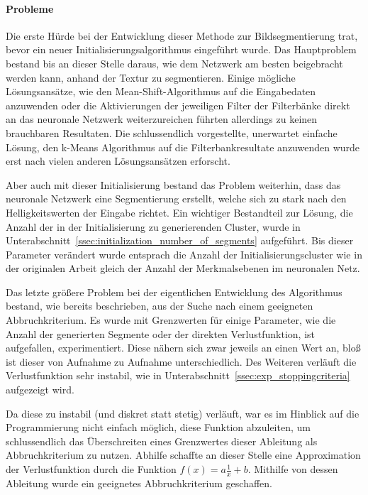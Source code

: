 \paragraph{Probleme} Die erste Hürde bei der Entwicklung dieser Methode zur Bildsegmentierung trat, bevor ein neuer Initialisierungsalgorithmus eingeführt wurde. Das Hauptproblem bestand bis an dieser Stelle daraus, wie dem Netzwerk am besten beigebracht werden kann, anhand der Textur zu segmentieren. Einige mögliche Lösungsansätze, wie den Mean-Shift-Algorithmus auf die Eingabedaten anzuwenden oder die Aktivierungen der jeweiligen Filter der Filterbänke direkt an das neuronale Netzwerk weiterzureichen führten allerdings zu keinen brauchbaren Resultaten. Die schlussendlich vorgestellte, unerwartet einfache Lösung, den k-Means Algorithmus auf die Filterbankresultate anzuwenden wurde erst nach vielen anderen Lösungsansätzen erforscht.

Aber auch mit dieser Initialisierung bestand das Problem weiterhin, dass das neuronale Netzwerk eine Segmentierung erstellt, welche sich zu stark nach den Helligkeitswerten der Eingabe richtet. Ein wichtiger Bestandteil zur Lösung, die Anzahl der in der Initialisierung zu generierenden Cluster, wurde in Unterabschnitt~\ref{ssec:initialization_number_of_segments} aufgeführt. Bis dieser Parameter verändert wurde entsprach die Anzahl der Initialisierungscluster wie in der originalen Arbeit \cite{kanezaki_18} gleich der Anzahl der Merkmalsebenen im neuronalen Netz.

Das letzte größere Problem bei der eigentlichen Entwicklung des Algorithmus bestand, wie bereits beschrieben, aus der Suche nach einem geeigneten Abbruchkriterium. Es wurde mit Grenzwerten für einige Parameter, wie die Anzahl der generierten Segmente oder der direkten Verlustfunktion, ist aufgefallen, experimentiert. Diese nähern sich zwar jeweils an einen Wert an, bloß ist dieser von Aufnahme zu Aufnahme unterschiedlich. Des Weiteren verläuft \bspw die Verlustfunktion sehr instabil, wie in Unterabschnitt~\ref{ssec:exp_stoppingcriteria} aufgezeigt wird. 

Da diese zu instabil (und diskret statt stetig) verläuft, war es im Hinblick auf die Programmierung nicht einfach möglich, diese Funktion abzuleiten, um schlussendlich das Überschreiten eines Grenzwertes dieser Ableitung als Abbruchkriterium zu nutzen. Abhilfe schaffte an dieser Stelle eine Approximation der Verlustfunktion durch die Funktion $f(x)=a\frac{1}{x}+b$. Mithilfe von dessen Ableitung wurde ein geeignetes Abbruchkriterium geschaffen.


